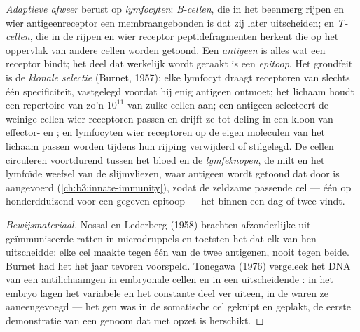 \begin{definition}\label{def:b3:adaptive-immunity:lymphocytes}
\emph{Adaptieve afweer} berust op \emph{lymfocyten}: \emph{B-cellen},
die in het beenmerg rijpen en wier antigeenreceptor een
membraangebonden \emph{} is dat zij later uitscheiden; en
\emph{T-cellen}, die in de  rijpen en wier receptor
peptidefragmenten herkent die op het oppervlak van andere cellen worden
getoond. Een \emph{antigeen} is alles wat een receptor bindt; het deel
dat werkelijk wordt geraakt is een \emph{epitoop}. Het grondfeit is de
\emph{klonale selectie} (Burnet, 1957): elke lymfocyt draagt receptoren
van slechts één specificiteit, vastgelegd voordat hij enig antigeen
ontmoet; het lichaam houdt een repertoire van zo'n $10^{11}$ van zulke
cellen aan; een antigeen selecteert de weinige cellen wier receptoren
passen en drijft ze tot deling in een kloon van effector- en
; en lymfocyten wier receptoren op de eigen moleculen van
het lichaam passen worden tijdens hun rijping verwijderd of stilgelegd.
De cellen circuleren voortdurend tussen het bloed en de
\emph{lymfeknopen}, de milt en het lymfoïde weefsel van de slijmvliezen,
waar antigeen wordt getoond dat door  is aangevoerd
(\cref{ch:b3:innate-immunity}), zodat de zeldzame passende cel --- één
op honderdduizend voor een gegeven epitoop --- het binnen een dag of
twee vindt.
\end{definition}

\begin{proof}[Bewijsmateriaal]
Nossal en Lederberg (1958) brachten afzonderlijke  uit
geïmmuniseerde ratten in microdruppels en toetsten het  dat
elk van hen uitscheidde: elke cel maakte  tegen één van de
twee antigenen, nooit tegen beide. Burnet had het het jaar tevoren
voorspeld. Tonegawa (1976) vergeleek het DNA van een antilichaamgen in
embryonale cellen en in een  uitscheidende : in het
embryo lagen het variabele en het constante deel ver uiteen, in de
 waren ze aaneengevoegd --- het gen was in de somatische cel
geknipt en geplakt, de eerste demonstratie van een genoom dat met opzet
is herschikt.
\end{proof}

